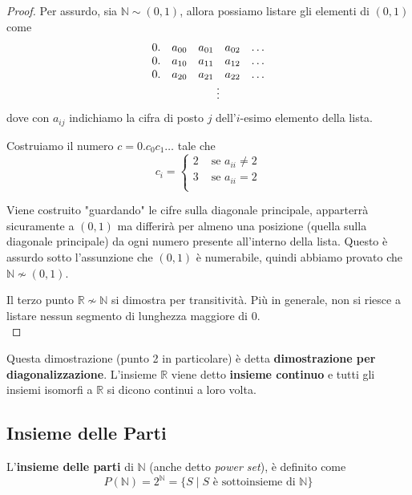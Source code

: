 \begin{proof}
    Per assurdo, sia $\mathbb{N} \sim (0,1)$, allora possiamo listare gli elementi di $(0,1)$ come
	$$ 
	\begin{array}{c c c c c}
		0. & a_{00} & a_{01} & a_{02} & \dots \\
		0. & a_{10} & a_{11} & a_{12} & \dots \\
		0. & a_{20} & a_{21} & a_{22} & \dots \\
		 & \multicolumn{4}{c}{\vdots}
	\end{array}
	$$
	dove con $a_{ij}$ indichiamo la cifra di posto $j$ dell'$i$-esimo elemento della lista.
	
	Costruiamo il numero $c = 0.c_0 c_1 \dots$ tale che
	$$ c_{i} = \begin{cases}
		2 & \text{ se } a_{ii} \neq 2 \\
		3 & \text{ se } a_{ii} = 2 \\
	\end{cases}$$
	
	Viene costruito "guardando" le cifre sulla diagonale principale, apparterrà sicuramente a $(0,1)$ ma differirà per almeno una posizione (quella sulla diagonale principale) da ogni numero presente all'interno della lista. Questo è assurdo sotto l'assunzione che $(0,1)$ è numerabile, quindi abbiamo provato che $\mathbb{N} \nsim (0,1)$.
	
	Il terzo punto $\mathbb{R} \nsim \mathbb{N}$ si dimostra per transitività. Più in generale, non si riesce a listare nessun segmento di lunghezza maggiore di 0. \\
\end{proof}

Questa dimostrazione (punto 2 in particolare) è detta \textbf{dimostrazione per diagonalizzazione}. L'insieme $\mathbb{R}$ viene detto \textbf{insieme continuo} e tutti gli insiemi isomorfi a $\mathbb{R}$ si dicono continui a loro volta.

\subsection{Insieme delle Parti}
L'\textbf{insieme delle parti} di $\mathbb{N}$ (anche detto \textit{power set}), è definito come
$$ P(\mathbb{N}) = 2^{\mathbb{N}} = \{S \mid S \text{ è sottoinsieme di } \mathbb{N}\} $$

